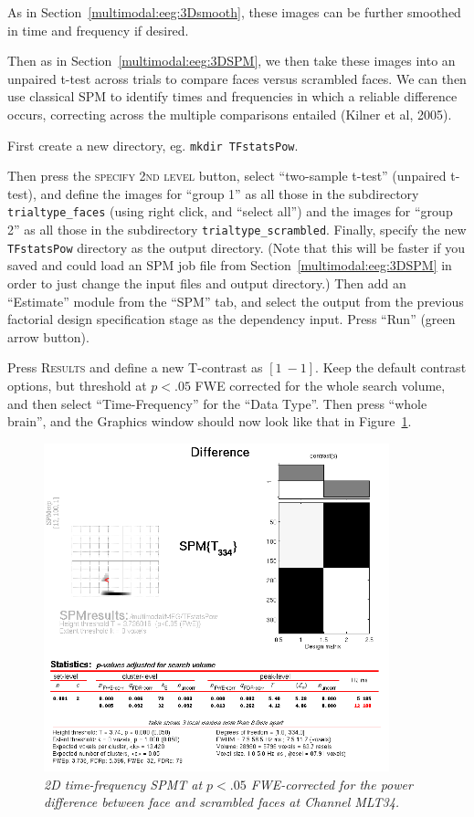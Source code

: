 As in Section~\ref{multimodal:eeg:3Dsmooth}, these images can be further smoothed in time and frequency if desired. 

Then as in Section~\ref{multimodal:eeg:3DSPM}, we then take these images into an unpaired t-test across trials to compare faces versus scrambled faces. We can then use classical SPM to identify times and frequencies in which a reliable difference occurs, correcting across the multiple comparisons entailed (Kilner et al, 2005).

First create a new directory, eg. \texttt{mkdir TFstatsPow}.

Then press the \textsc{specify 2nd level} button, select ``two-sample t-test'' (unpaired t-test), and define the images for ``group 1'' as all those in the subdirectory \texttt{trialtype\_faces} (using right click, and ``select all'') and the images for ``group 2'' as all those in the subdirectory \texttt{trialtype\_scrambled}. Finally, specify the new \texttt{TFstatsPow} directory as the output directory. (Note that this will be faster if you saved and could load an SPM job file from Section~\ref{multimodal:eeg:3DSPM} in order to just change the input files and output directory.) Then add an ``Estimate'' module from the ``SPM'' tab, and select the output from the previous factorial design specification stage as the dependency input. Press ``Run'' (green arrow button).

Press \textsc{Results} and define a new T-contrast as $[1\: -1]$. Keep the default contrast options, but threshold at $p<.05$ FWE corrected for the whole search volume, and then select ``Time-Frequency'' for the ``Data Type''. Then press ``whole brain'', and the Graphics window should now look like that in Figure~\ref{multimodal:fig:16}.

\begin{figure}
\begin{center}
\includegraphics[width=100mm]{multimodal/figures/meg_TF_results}
\caption{\em 2D time-frequency SPM{T} at $p<.05$ FWE-corrected for the power difference between face and scrambled faces at Channel MLT34.\label{multimodal:fig:16}}
\end{center}
\end{figure}

